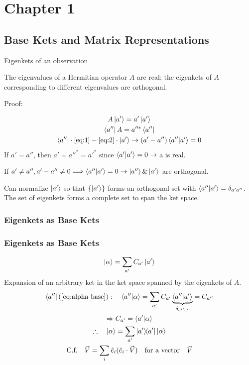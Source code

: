 \section{Chapter 1}
\subsection[Base Kets]{Base Kets and Matrix Representations}
\begin{frame}{Eigenkets of an observation}
	\begin{theorem}[1]
		The eigenvalues of a Hermitian operator $A$ are real; the eigenkets of $A$ corresponding to different eigenvalues are orthogonal.
	\end{theorem}
	Proof:

	\begin{gather}
		A\ket{a'} = a'\ket{a'} \label{eq:1}\\
		\bra{a'' }A = a''^* \bra{a''} \label{eq:2}\\
		\bra{a''} \cdot \ref{eq:1} - \ref{eq:2}\cdot \ket{a'} \to (a'-a'') \ip{a''}{a'} = 0
	\end{gather}
	If $a'=a''$, then $a'=a''^*=a'^*$ since $\ip{a'}{a'} = 0 \to $ a is real.

	If $a'\ne a'', a'-a'' \ne 0 \Longrightarrow \ip{a''}{a'} = 0 \to \ket{a''} \& \ket{a'}$ are orthogonal.

	\vfill

	Can normalize $\ket{a'}$ so that $\{\ket{a'}\}$ forms an orthogonal set with $\ip{a''}{a'}= \delta_{a' a''}$.
	The set of eigenkets forms a complete set to span the ket space.
\end{frame}

\subsubsection{Eigenkets as Base Kets}
\begin{frame}
	\frametitle{Eigenkets as Base Kets}

	\begin{equation}\label{eq:alpha base}
		\ket{\alpha} = \sum_{a'} C_{a'} \ket{a'}
	\end{equation}
	Expansion of an arbitrary ket in the ket space spanned by the eigenkets of $A$.
	\begin{gather*}
		\bra{a''} (\ref{eq:alpha base}): \quad \ip{a''}{\alpha} = \sum_{a'} C_{a'} \underbrace{\ip{a''}{a'}}_{\delta_{a'' a'}} = C_{a''}\\
		\Rightarrow C_{a'} = \ip{a'}{\alpha}\\
		\therefore \quad \ket{\alpha} = \sum_{a'} \op{a'}\ket{\alpha}\\
		\text{C.f.} \quad \vec{V} = \sum_i \hat e_i (\hat e_i \cdot \vec V) \qq{for a vector} \vec V
	\end{gather*}
\end{frame}


